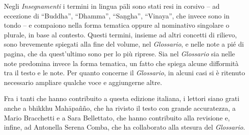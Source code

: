 Negli \emph{Insegnamenti} i termini in lingua pāli sono stati resi in
corsivo -- ad eccezione di ``Buddha'', ``Dhamma'', ``Saṇgha'',
``Vinaya'', che invece sono in tondo -- e compaiono nella forma tematica
oppure al nominativo singolare o plurale, in base al contesto. Questi
termini, insieme ad altri concetti di rilievo, sono brevemente spiegati
alla fine del volume, nel \emph{Glossario}, e nelle note a pié di
pagina, che da quest'ultimo sono per lo più riprese. Sia nel
\emph{Glossario} sia nelle note predomina invece la forma tematica, un
fatto che spiega alcune difformità tra il testo e le note. Per quanto
concerne il \emph{Glossario}, in alcuni casi si è ritenuto necessario
ampliare qualche voce e aggiungerne altre.

Fra i tanti che hanno contribuito a questa edizione italiana, i lettori
siano grati anche a bhikkhu Mahāpañño, che ha rivisto il testo con
grande accuratezza, a Mario Bracchetti e a Sara Bellettato, che hanno
contribuito alla revisione e, infine, ad Antonella Serena Comba, che ha
collaborato alla stesura del \emph{Glossario}.


